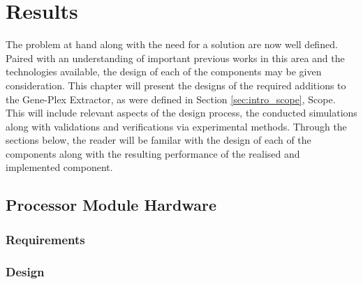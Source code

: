 \chapter{Results}
\label{cha:results}
%
%
%

The problem at hand along with the need for a solution are now well defined. Paired with an understanding of important previous works in this area and the technologies available, the design of each of the components may be given consideration. This chapter will present the designs of the required additions to the Gene-Plex Extractor, as were defined in Section \ref{sec:intro_scope}, Scope. This will include relevant aspects of the design process, the conducted simulations along with validations and verifications via experimental methods. Through the sections below, the reader will be familar with the design of each of the components along with the resulting performance of the realised and implemented component.\\

\section{Processor Module Hardware}

\subsection{Requirements}

\subsection{Design}

